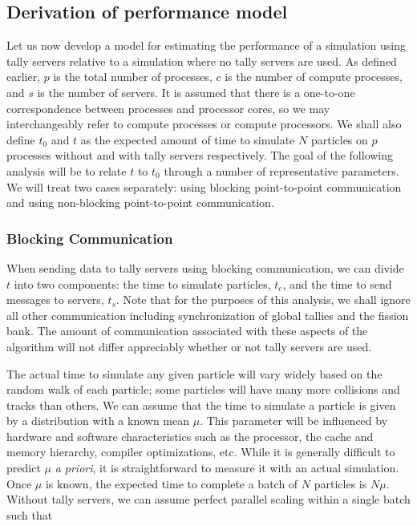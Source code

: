\subsection{Derivation of performance model}

Let us now develop a model for estimating the performance of a simulation using
tally servers relative to a simulation where no tally servers are used. As
defined earlier, $p$ is the total number of processes, $c$ is the number of
compute processes, and $s$ is the number of servers. It is assumed that there is
a one-to-one correspondence between processes and processor cores, so we may
interchangeably refer to compute processes or compute processors. We shall also
define $t_0$ and $t$ as the expected amount of time to simulate $N$ particles on
$p$ processes without and with tally servers respectively. The goal of the
following analysis will be to relate $t$ to $t_0$ through a number of
representative parameters. We will treat two cases separately: using blocking
point-to-point communication and using non-blocking point-to-point
communication.

\subsubsection{Blocking Communication}

When sending data to tally servers using blocking communication, we can divide
$t$ into two components: the time to simulate particles, $t_c$, and the time to
send messages to servers, $t_s$. Note that for the purposes of this analysis, we
shall ignore all other communication including synchronization of global tallies
and the fission bank. The amount of communication associated with these aspects
of the algorithm will not differ appreciably whether or not tally servers are
used.

The actual time to simulate any given particle will vary widely based on the
random walk of each particle; some particles will have many more collisions and
tracks than others. We can assume that the time to simulate a particle is given
by a distribution with a known mean $\mu$. This parameter will be influenced by
hardware and software characteristics such as the processor, the cache and
memory hierarchy, compiler optimizations, etc. While it is generally difficult
to predict $\mu$ \emph{a priori}, it is straightforward to measure it with an
actual simulation. Once $\mu$ is known, the expected time to complete a batch of
$N$ particles is $N\mu$. Without tally servers, we can assume perfect parallel
scaling within a single batch \cite{ane-romano-2013} such that

